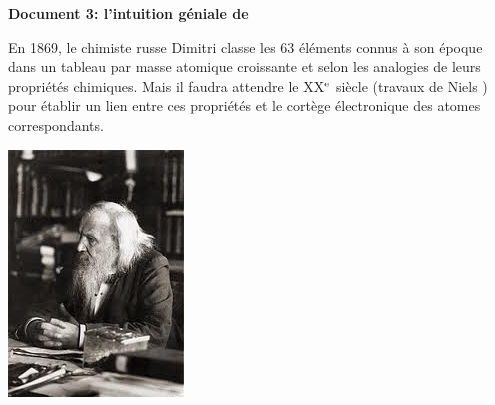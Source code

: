 \documentclass[french]{article}
\begin{document}
\begin{mdframed}[style=doc, leftmargin=0cm, rightmargin=0cm, innertopmargin=8pt, innerbottommargin=8pt, innerrightmargin=10pt, innerleftmargin=10pt]

	\noindent\textbf{Document 3: l'intuition géniale de }\medskip

	\begin{minipage}{4cm}
	En 1869, le chimiste russe Dimitri  classe les 63 éléments connus à son époque dans un tableau par masse atomique croissante et selon les analogies de leurs propriétés chimiques. Mais il faudra attendre le XX$^{\rm e}$ siècle (travaux de Niels ) pour établir un lien entre ces propriétés et le cortège électronique des atomes correspondants.
	\end{minipage}\hspace{.5cm}
	\begin{minipage}{5cm}
	\includegraphics[width=.9\textwidth]{Mendeleiev.png}
	\end{minipage}\hfill
	\begin{minipage}{6cm}

\end{minipage}
\end{mdframed}
\end{document}
